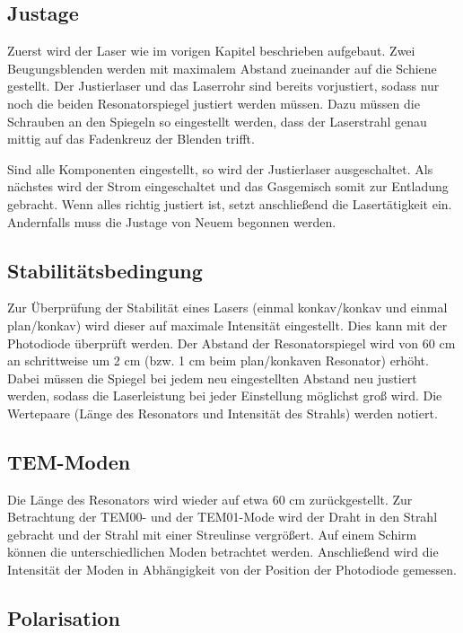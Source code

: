 \subsection{Justage}

Zuerst wird der Laser wie im vorigen Kapitel beschrieben aufgebaut. Zwei Beugungsblenden werden mit maximalem Abstand
zueinander auf die Schiene gestellt. Der Justierlaser und das Laserrohr sind bereits vorjustiert, sodass
nur noch die beiden Resonatorspiegel justiert werden müssen. Dazu müssen die Schrauben an den Spiegeln so eingestellt werden,
dass der Laserstrahl genau mittig auf das Fadenkreuz der Blenden trifft.

Sind alle Komponenten eingestellt, so wird der Justierlaser ausgeschaltet. Als nächstes wird der Strom eingeschaltet und das
Gasgemisch somit zur Entladung gebracht. Wenn alles richtig justiert ist, setzt anschließend die Lasertätigkeit ein. Andernfalls
muss die Justage von Neuem begonnen werden.

\subsection{Stabilitätsbedingung}

Zur Überprüfung der Stabilität eines Lasers (einmal konkav/konkav und einmal plan/konkav) wird dieser auf maximale Intensität
eingestellt. Dies kann mit der Photodiode überprüft werden. Der Abstand der Resonatorspiegel wird von 60 cm an schrittweise um 2 cm
(bzw. 1 cm beim plan/konkaven Resonator) erhöht. Dabei müssen die Spiegel bei jedem neu eingestellten Abstand neu justiert
werden, sodass die Laserleistung bei jeder Einstellung möglichst groß wird.
Die Wertepaare (Länge des Resonators und Intensität des Strahls) werden notiert.

\subsection{TEM-Moden}

Die Länge des Resonators wird wieder auf etwa 60 cm zurückgestellt.
Zur Betrachtung der TEM00- und der TEM01-Mode wird der Draht in den Strahl gebracht und der Strahl mit einer Streulinse vergrößert. Auf einem
Schirm können die unterschiedlichen Moden betrachtet werden. Anschließend wird die Intensität der Moden in Abhängigkeit
von der Position der Photodiode gemessen.

\subsection{Polarisation}


